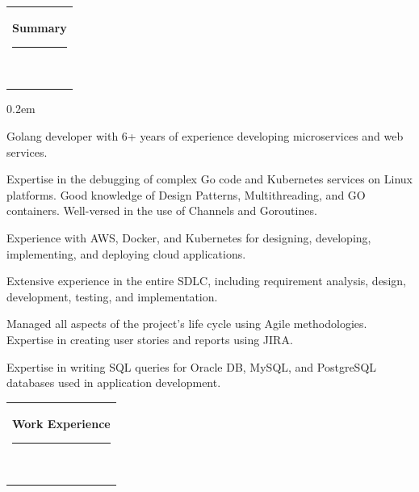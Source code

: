 \documentclass[11pt,A4]{article}
\newcommand{\mpwidth}{\linewidth-\fboxsep-\fboxsep}
\newcommand{\cvlist}[1] {
	\begin{itemize}{#1}\end{itemize}
}
\newcommand{\cvtext}[1] {
	\begin{tabular*}{1\mpwidth}{p{0.96\mpwidth}}
		\parbox{1\mpwidth}{#1}
	\end{tabular*}
}
\newcommand{\cvsection}[1] {
	
\cvtext{
		\textbf{\LARGE{\textcolor{darkcol}{{#1}}}}\\[-6pt]
		\textcolor{maincol}{ \rule{0.1\textwidth}{1pt} } \\
	}
}
\begin{document}
\cvsection{Summary}

{\cvlist{
\itemsep0.2em
\item Golang developer with 6+ years of experience developing microservices and web services. 
\item Expertise in the debugging of complex Go code and Kubernetes services on Linux platforms. Good knowledge of Design Patterns, Multithreading, and GO containers. Well-versed in the use of Channels and Goroutines.

\item Experience with AWS, Docker, and Kubernetes for designing, developing, implementing, and deploying cloud applications.

\item Extensive experience in the entire SDLC, including requirement analysis, design, development, testing, and implementation.

\item Managed all aspects of the project's life cycle using Agile methodologies. Expertise in creating user stories and reports using JIRA.

\item Expertise in writing SQL queries for Oracle DB, MySQL, and PostgreSQL databases used in application development.

}}
\vspace{15pt}

\cvsection{Work Experience}
\end{document}
